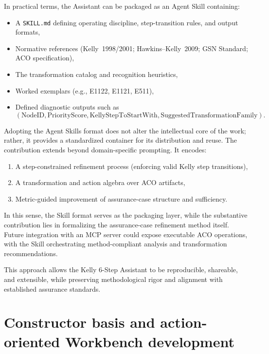 \documentclass{article}
\begin{document}
In practical terms, the Assistant can be packaged as an Agent Skill containing:

\begin{itemize}
  \item A \texttt{SKILL.md} defining operating discipline, step-transition rules, and output formats,
  \item Normative references (Kelly~1998/2001; Hawkins--Kelly~2009; GSN Standard; ACO specification),
  \item The transformation catalog and recognition heuristics,
  \item Worked exemplars (e.g., E1122, E1121, E511),
  \item Defined diagnostic outputs such as
  \[
    (\text{NodeID}, \text{PriorityScore}, \text{KellyStepToStartWith}, \text{SuggestedTransformationFamily}).
  \]
\end{itemize}

Adopting the Agent Skills format does not alter the intellectual core of the work; rather, it provides a standardized container for its distribution and reuse. The contribution extends beyond domain-specific prompting. It encodes:

\begin{enumerate}
  \item A step-constrained refinement process (enforcing valid Kelly step transitions),
  \item A transformation and action algebra over ACO artifacts,
  \item Metric-guided improvement of assurance-case structure and sufficiency.
\end{enumerate}

In this sense, the Skill format serves as the packaging layer, while the substantive contribution lies in formalizing the assurance-case refinement method itself. Future integration with an MCP server could expose executable ACO operations, with the Skill orchestrating method-compliant analysis and transformation recommendations.

This approach allows the Kelly 6-Step Assistant to be reproducible, shareable, and extensible, while preserving methodological rigor and alignment with established assurance standards.



\clearpage
\section{Constructor basis and action-oriented Workbench development}
\end{document}
